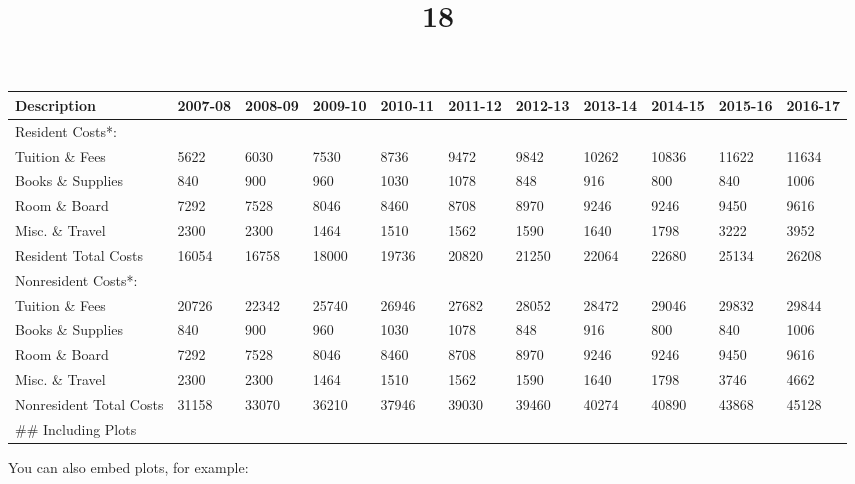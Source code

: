 \documentclass[]{article}
\title{18}
\author{}
\date{}
\begin{document}
\maketitle

\begin{longtable}[]{@{}lllllllllll@{}}
\toprule
Description & 2007-08 & 2008-09 & 2009-10 & 2010-11 & 2011-12 & 2012-13
& 2013-14 & 2014-15 & 2015-16 & 2016-17\tabularnewline
\midrule
\endhead
Resident Costs*: & & & & & & & & & &\tabularnewline
Tuition \& Fees & 5622 & 6030 & 7530 & 8736 & 9472 & 9842 & 10262 &
10836 & 11622 & 11634\tabularnewline
Books \& Supplies & 840 & 900 & 960 & 1030 & 1078 & 848 & 916 & 800 &
840 & 1006\tabularnewline
Room \& Board & 7292 & 7528 & 8046 & 8460 & 8708 & 8970 & 9246 & 9246 &
9450 & 9616\tabularnewline
Misc. \& Travel & 2300 & 2300 & 1464 & 1510 & 1562 & 1590 & 1640 & 1798
& 3222 & 3952\tabularnewline
Resident Total Costs & 16054 & 16758 & 18000 & 19736 & 20820 & 21250 &
22064 & 22680 & 25134 & 26208\tabularnewline
Nonresident Costs*: & & & & & & & & & &\tabularnewline
Tuition \& Fees & 20726 & 22342 & 25740 & 26946 & 27682 & 28052 & 28472
& 29046 & 29832 & 29844\tabularnewline
Books \& Supplies & 840 & 900 & 960 & 1030 & 1078 & 848 & 916 & 800 &
840 & 1006\tabularnewline
Room \& Board & 7292 & 7528 & 8046 & 8460 & 8708 & 8970 & 9246 & 9246 &
9450 & 9616\tabularnewline
Misc. \& Travel & 2300 & 2300 & 1464 & 1510 & 1562 & 1590 & 1640 & 1798
& 3746 & 4662\tabularnewline
Nonresident Total Costs & 31158 & 33070 & 36210 & 37946 & 39030 & 39460
& 40274 & 40890 & 43868 & 45128\tabularnewline
\#\# Including Plots & & & & & & & & & &\tabularnewline
\bottomrule
\end{longtable}

You can also embed plots, for example:
\end{document}
